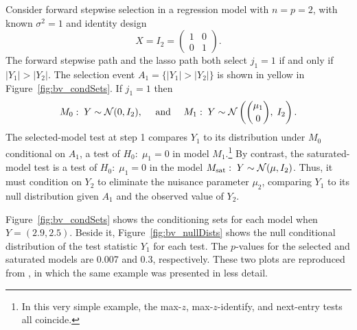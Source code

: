 \documentclass{article}
\begin{document}
\begin{example}\label{ex:bivariate}
  Consider forward stepwise selection in a regression model with $n=p=2$, with known $\sigma^2=1$ and identity design 
\[
X = I_2=\begin{pmatrix} 1 & 0 \\ 0 & 1\end{pmatrix}.
\] 
The forward stepwise path and the lasso path both select $j_1=1$ if and only if $|Y_1|>|Y_2|$. The selection event $A_1=\{|Y_1| > |Y_2|\}$ is shown in yellow in Figure~\ref{fig:bv_condSets}. If $j_1=1$ then
\[
M_0:\; Y\sim \mathcal{N}(0,I_2), \quad \text{ and } \quad
M_1:\; Y \sim \mathcal{N}\left(\binom{\mu_1}{0}, \; I_2\right).
\]
The selected-model test at step 1 compares $Y_1$ to its distribution under $M_0$ conditional on $A_1$, a test of $H_0:\;\mu_1=0$ in model $M_1$.\footnote{In this very simple example, the max-$z$, max-$z$-identify, and next-entry tests all coincide.} By contrast, the saturated-model test is a test of $H_0:\; \mu_1=0$ in the model $M_{\text{sat}}:\; Y \sim \mathcal{N}(\mu, I_2)$. Thus, it must condition on $Y_2$ to eliminate the nuisance parameter $\mu_2$, comparing $Y_1$ to its null distribution given $A_1$ and the observed value of $Y_2$.

Figure~\ref{fig:bv_condSets} shows the conditioning sets for each model when $Y=(2.9, 2.5)$. Beside it, Figure~\ref{fig:bv_nullDists} shows the null conditional distribution of the test statistic $Y_1$ for each test. The $p$-values for the selected and saturated models are 0.007 and 0.3, respectively. These two plots are reproduced from \citet{fithian2014optimal}, in which the same example was presented in less detail.
\end{example}
\end{document}
